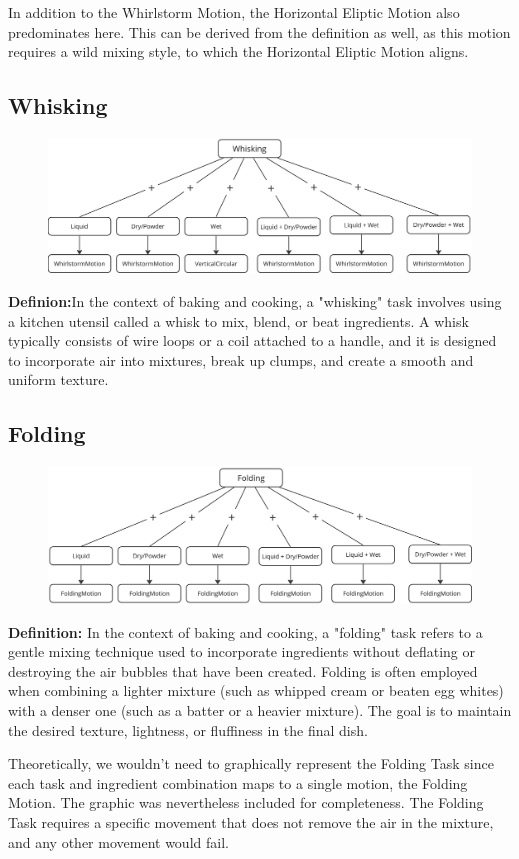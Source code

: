 In addition to the Whirlstorm Motion, the Horizontal Eliptic Motion also predominates here. This can be derived from the definition as well, as this motion requires a wild mixing style, to which the Horizontal Eliptic Motion aligns.
\subsection{Whisking}
\begin{figure}[H]
    \includegraphics[scale=0.18]{Graphics/WhiskingDecisionTree.jpg}
    \end{figure}
\textbf{Definion:}In the context of baking and cooking, a "whisking" task involves using a kitchen utensil called a whisk to mix, blend, or beat ingredients. A whisk typically consists of wire loops or a coil attached to a handle, and it is designed to incorporate air into mixtures, break up clumps, and create a smooth and uniform texture.

\subsection{Folding}
\begin{figure}[H]
    \includegraphics[scale=0.18]{Graphics/FoldingDecisionTree.jpg}
    \end{figure}
\textbf{Definition:}
In the context of baking and cooking, a "folding" task refers to a gentle mixing technique used to incorporate ingredients without deflating or destroying the air bubbles that have been created. Folding is often employed when combining a lighter mixture (such as whipped cream or beaten egg whites) with a denser one (such as a batter or a heavier mixture). The goal is to maintain the desired texture, lightness, or fluffiness in the final dish.

Theoretically, we wouldn't need to graphically represent the Folding Task since each task and ingredient combination maps to a single motion, the Folding Motion. The graphic was nevertheless included for completeness. The Folding Task requires a specific movement that does not remove the air in the mixture, and any other movement would fail.
